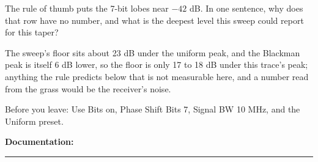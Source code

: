 \documentclass{exam}
\begin{document}
\begin{questions}
The rule of thumb puts the 7-bit lobes near $-42$ dB. In one sentence, why
does that row have no number, and what is the deepest level this sweep could
report for this taper?

\begin{solutionorlines}[1.1in]
The sweep's floor sits about 23 dB under the uniform peak, and the Blackman
peak is itself 6 dB lower, so the floor is only 17 to 18 dB under this trace's
peak; anything the rule predicts below that is not measurable here, and a
number read from the grass would be the receiver's noise.
\end{solutionorlines}

Before you leave: Use Bits on, Phase Shift Bits 7, Signal BW 10 MHz, and the
Uniform preset.

\end{questions}

\vspace{1.0em}
\noindent\textbf{Documentation:} \rule[-2pt]{0.6\linewidth}{0.4pt}
\end{document}
